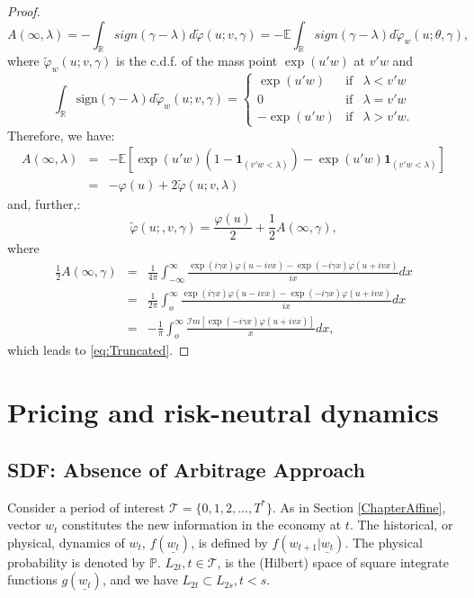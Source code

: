 \documentclass[
  12pt,
]{book}
\theoremstyle{definition}
\theoremstyle{definition}
\theoremstyle{definition}
\theoremstyle{definition}
\theoremstyle{remark}
\begin{document}
\begin{proof}
\[
A(\infty,\lambda) = -  \int_{\mathbb{R}} sign(\gamma-\lambda)d\tilde{\varphi}(u;v,\gamma) = -\mathbb{E}  \int_{\mathbb{R}} sign(\gamma-\lambda)d\tilde{\varphi}_w(u;\theta,\gamma),
\]
where \(\tilde{\varphi}_w(u;v,\gamma)\) is the c.d.f. of the mass point \(\exp(u'w)\) at \(v'w\) and
\[
\int_{\mathbb{R}} \mbox{sign}(\gamma-\lambda)d\tilde{\varphi}_w(u;v,\gamma)=
\left\{
\begin{array}{ccc}
\exp(u'w) & \mbox{if} & \lambda < v'w \\
0 & \mbox{if}& \lambda = v'w \\
-\exp(u'w) & \mbox{if} & \lambda > v'w.
\end{array}
\right.
\]
Therefore, we have:
\begin{eqnarray*}
A(\infty,\lambda) & =& - \mathbb{E}[\exp(u'w)(1-\textbf{1}_{(v'w<\lambda)})-\exp(u'w)\textbf{1}_{(v'w<\lambda)}] \\
& =& - \varphi(u) + 2\tilde{\varphi}(u;v,\lambda)
\end{eqnarray*}
and, further,:
\[
\tilde{\varphi}(u;,v,\gamma) =  \frac{\varphi(u)}{2} +  \frac{1}{2} A(\infty,\gamma),
\]
where
\begin{eqnarray*}
\frac{1}{2} A(\infty,\gamma) & =&  \frac{1}{4\pi} \int^{\infty}_{-\infty}  \frac{\exp(i\gamma x)\varphi(u-ivx)-\exp(-i\gamma x)\varphi(u+ivx)}{ix} dx \\
& =&  \frac{1}{2\pi} \int^{\infty}_{o}  \frac{\exp(i\gamma x)\varphi(u-ivx)-\exp(-i\gamma x)\varphi(u+ivx)}{ix} dx \\
& =& -  \frac{1}{\pi} \int^{\infty}_{o}  \frac{{\mathcal I}m[\exp(-i\gamma x)\varphi(u+ivx)]}{x}dx,
\end{eqnarray*}
which leads to \eqref{eq:Truncated}.
\end{proof}

\hypertarget{PandQ}{%
\chapter{Pricing and risk-neutral dynamics}\label{PandQ}}

\hypertarget{PricingAAO}{%
\section{SDF: Absence of Arbitrage Approach}\label{PricingAAO}}

Consider a period of interest \({\mathcal T} = \{0,1,2,...,T^*\}\). As in Section \ref{ChapterAffine}, vector \(w_t\) constitutes the new information in the economy at \(t\). The historical, or physical, dynamics of \(w_t\), \(f(\underline{w_t})\), is defined by \(f(w_{t+1}|\underline{w_t})\). The physical probability is denoted by \(\mathbb{P}\). \(L_{2t}, t \in {\mathcal T}\), is the (Hilbert) space of square integrate functions \(g(\underline{w_t})\), and we have \(L_{2t} \subset L_{2s}, t< s\).
\end{document}
